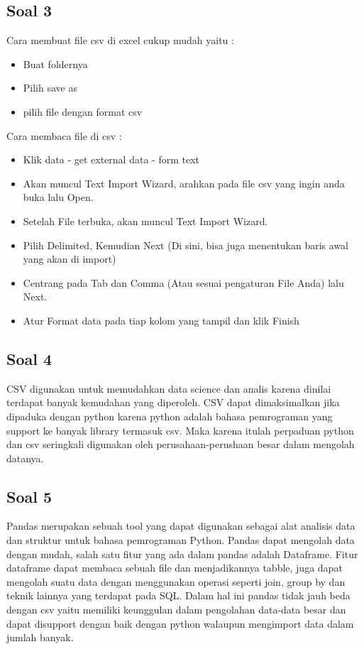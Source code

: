 \subsection{Soal 3}
 Cara membuat file csv di excel cukup mudah yaitu :
\begin{itemize}
	\item Buat foldernya
	\item Pilih save as
	\item pilih file dengan format csv
\end{itemize}
Cara membaca file di csv :
\begin{itemize}
	\item Klik data - get external data - form text
	\item Akan muncul Text Import Wizard, arahkan pada file csv yang ingin anda buka lalu Open.
	\item Setelah File terbuka, akan muncul Text Import Wizard.
	\item Pilih Delimited, Kemudian Next (Di sini, bisa juga menentukan baris awal yang akan di import)
	\item Centrang pada Tab dan Comma (Atau sesuai pengaturan File Anda) lalu Next.
	\item Atur Format data pada tiap kolom yang tampil dan klik Finish
\end{itemize}

\subsection{Soal 4}
 CSV digunakan untuk memudahkan data science dan analis karena dinilai terdapat banyak kemudahan yang diperoleh. CSV dapat dimaksimalkan jika dipaduka dengan python karena python adalah bahasa pemrograman yang support ke banyak library termasuk csv. Maka karena itulah perpaduan python dan csv seringkali digunakan oleh perusahaan-perushaan besar dalam mengolah datanya.

\subsection{Soal 5}
Pandas merupakan sebuah tool yang dapat digunakan sebagai alat analisis data dan struktur untuk bahasa pemrograman Python. Pandas dapat mengolah data dengan mudah, salah satu fitur yang ada dalam pandas adalah Dataframe. Fitur dataframe dapat membaca sebuah file dan menjadikannya tabble, juga dapat mengolah suatu data dengan menggunakan operasi seperti join, group by dan teknik lainnya yang terdapat pada SQL. Dalam hal ini pandas tidak jauh beda dengan csv yaitu memiliki keunggulan dalam pengolahan data-data besar dan dapat disupport dengan baik dengan python walaupun mengimport data dalam jumlah banyak.


